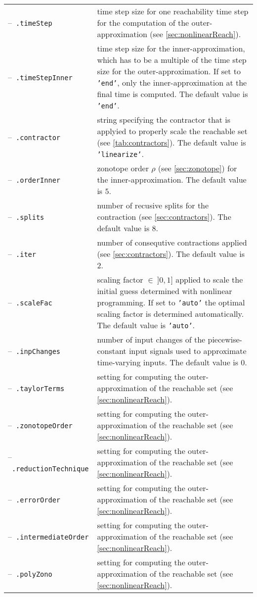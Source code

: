 \begin{center}
\renewcommand{\arraystretch}{1.3}
\begin{longtable}[t]{l p{10cm}}	
	--~\texttt{.timeStep} & time step size for one reachability time step for the computation of the outer-approximation (see \cref{sec:nonlinearReach}). \\
	--~\texttt{.timeStepInner} & time step size for the inner-approximation, which has to be a multiple of the time step size for the outer-approximation. If set to \texttt{'end'}, only the inner-approximation at the final time is computed. The default value is \texttt{'end'}.\\
	--~\texttt{.contractor} & string specifying the contractor that is applyied to properly scale the reachable set (see \cref{tab:contractors}). The default value is \texttt{'linearize'}. \\
	--~\texttt{.orderInner} & zonotope order $\rho$ (see \cref{sec:zonotope}) for the inner-approximation. The default value is $5$. \\
	--~\texttt{.splits} & number of recusive splits for the contraction (see \cref{sec:contractors}). The default value is $8$. \\
	--~\texttt{.iter} & number of consequtive contractions applied (see \cref{sec:contractors}). The default value is $2$.\\
	--~\texttt{.scaleFac} & scaling factor $\in ~]0,1]$ applied to scale the initial guess determined with nonlinear programming. If set to \texttt{'auto'} the optimal scaling factor is determined automatically. The default value is \texttt{'auto'}. \\
	--~\texttt{.inpChanges} & number of input changes of the piecewise-constant input signals used to approximate time-varying inputs. The default value is $0$. \\
	--~\texttt{.taylorTerms} & setting for computing the outer-approximation of the reachable set (see \cref{sec:nonlinearReach}).  \\
	--~\texttt{.zonotopeOrder} & setting for computing the outer-approximation of the reachable set (see \cref{sec:nonlinearReach}). \\
	--~\texttt{.reductionTechnique} & setting for computing the outer-approximation of the reachable set (see \cref{sec:nonlinearReach}). \\
	--~\texttt{.errorOrder} & setting for computing the outer-approximation of the reachable set (see \cref{sec:nonlinearReach}). \\
	--~\texttt{.intermediateOrder} & setting for computing the outer-approximation of the reachable set (see \cref{sec:nonlinearReach}). \\
	--~\texttt{.polyZono} & setting for computing the outer-approximation of the reachable set (see \cref{sec:nonlinearReach}).
\end{longtable}
\end{center}

